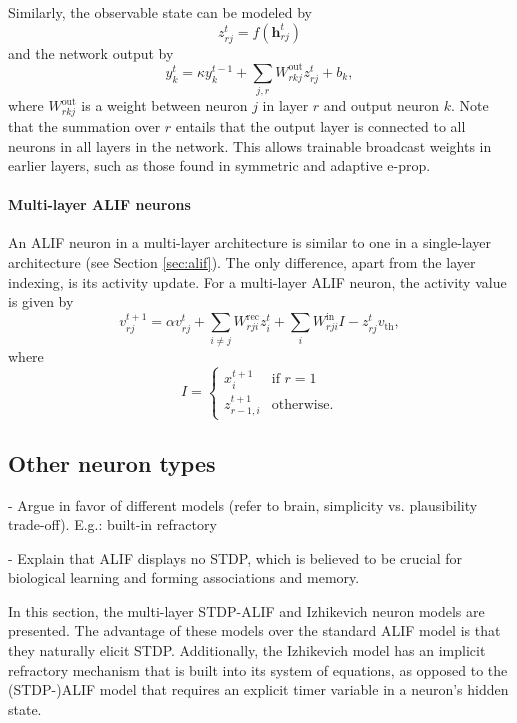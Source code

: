         Similarly, the observable state can be modeled by
        \begin{equation}\label{eq:ml_model_obs}
        z^t_{rj} = f\left(\mathbf{h}_{rj}^t\right)
        \end{equation}
        and the network output by
        \begin{equation}\label{eq:ml_model_obs}
        y^t_k = \kappa y^{t-1}_k + \sum_{j,r}W^\text{out}_{rkj}z_{rj}^t + b_k,
        \end{equation}
        where $W^\text{out}_{rkj}$ is a weight between neuron $j$ in layer $r$ and output neuron $k$.
        Note that the summation over $r$ entails that the output layer is connected to all neurons in all layers in the network.
        This allows trainable broadcast weights in earlier layers, such as those found in symmetric and adaptive e-prop.

        \paragraph{Multi-layer ALIF neurons}
        An ALIF neuron in a multi-layer architecture is similar to one in a single-layer architecture (see Section \ref{sec:alif}).
        The only difference, apart from the layer indexing, is its activity update.
        For a multi-layer ALIF neuron, the activity value is given by
        \begin{equation}\label{eq:ml_alifV}
        v^{t+1}_{rj} = \alpha v_{rj}^t + \sum_{i\neq j}W^\text{rec}_{rji}z_i^t + \sum_i W^\text{in}_{rji}I - z_{rj}^tv_
        \text{th},
        \end{equation}
        where
        \begin{equation}\label{eq:inpVml}
        I = \begin{cases}
        	x^{t+1}_i       &\mbox{if } r = 1 \\
            z^{t+1}_{r-1,i} &\mbox{otherwise.}
            \end{cases}
        \end{equation}


	\subsection{Other neuron types}
		\begin{tcolorbox}[colback=orange]
		- Argue in favor of different models (refer to brain, simplicity vs. plausibility trade-off). E.g.: built-in refractory

		- Explain that ALIF displays no STDP, which is believed to be crucial for biological learning and forming associations and memory.

		\end{tcolorbox}
		In this section, the multi-layer STDP-ALIF and Izhikevich neuron models are presented.
		The advantage of these models over the standard ALIF model is that they naturally elicit STDP.
		Additionally, the Izhikevich model has an implicit refractory mechanism that is built into its system of equations, as opposed to the (STDP-)ALIF model that requires an explicit timer variable in a neuron's hidden state.

